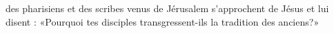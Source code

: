 \encetemps des pharisiens et des scribes venus de Jérusalem
		s’approchent de Jésus et lui disent :
	«Pourquoi tes disciples transgressent-ils la tradition des anciens?»
